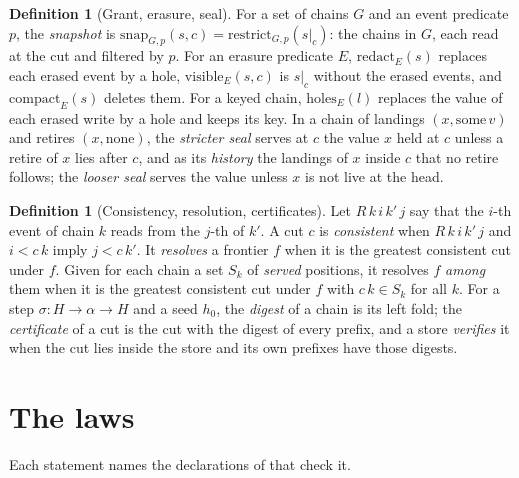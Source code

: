 \documentclass[11pt]{article}
\theoremstyle{plain}
\theoremstyle{definition}
\newtheorem{definition}[theorem]{Definition}
\newcommand{\lean}[1]{\path{#1}}
\newcommand{\at}[2]{#1|_{#2}}
\begin{document}
\begin{definition}[Grant, erasure, seal]
For a set of chains $G$ and an event predicate $p$, the \emph{snapshot} is
$\mathrm{snap}_{G,p}(s, c) = \mathrm{restrict}_{G,p}(\at{s}{c})$: the chains in $G$, each read at
the cut and filtered by $p$. For an erasure predicate $E$, $\mathrm{redact}_E(s)$ replaces each
erased event by a hole, $\mathrm{visible}_E(s, c)$ is $\at{s}{c}$ without the erased events, and
$\mathrm{compact}_E(s)$ deletes them. For a keyed chain, $\mathrm{holes}_E(l)$ replaces the value
of each erased write by a hole and keeps its key. In a chain of landings $(x, \mathrm{some}\,v)$
and retires $(x, \mathrm{none})$, the \emph{stricter seal} serves at $c$ the value $x$ held at
$c$ unless a retire of $x$ lies after $c$, and as its \emph{history} the landings of $x$ inside
$c$ that no retire follows; the \emph{looser seal} serves the value unless $x$ is not live at the
head.
\end{definition}

\begin{definition}[Consistency, resolution, certificates]
Let $R\,k\,i\,k'\,j$ say that the $i$-th event of chain $k$ reads from the $j$-th of $k'$. A cut
$c$ is \emph{consistent} when $R\,k\,i\,k'\,j$ and $i < c\,k$ imply $j < c\,k'$. It \emph{resolves}
a frontier $f$ when it is the greatest consistent cut under $f$. Given for each chain a set $S_k$
of \emph{served} positions, it resolves $f$ \emph{among} them when it is the greatest consistent
cut under $f$ with $c\,k \in S_k$ for all $k$. For a step $\sigma : H \to \alpha \to H$ and a seed
$h_0$, the \emph{digest} of a chain is its left fold; the \emph{certificate} of a cut is the cut
with the digest of every prefix, and a store \emph{verifies} it when the cut lies inside the
store and its own prefixes have those digests.
\end{definition}

\section{The laws}\label{sec:laws}

Each statement names the declarations of \lean{formal/Palace/Snapshot.lean} that check it.
\end{document}
